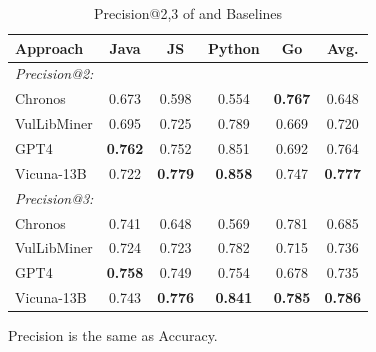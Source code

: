 \begin{table}[t]
\centering
\caption{Precision@2,3 of \detector{} and Baselines}
\label{tab: baseline cmp: precision}
\small
\begin{threeparttable}
\begin{tabular}{lccccc}
\toprule
Approach     & Java    & JS     & Python & Go  & Avg.   \\
\midrule
\multicolumn{5}{l}{\textit{Precision@2:}} &              \\
Chronos     & 0.673    & 0.598 & 0.554  & \textbf{0.767} & 0.648   \\
VulLibMiner & 0.695    & 0.725 & 0.789  & 0.669 & 0.720   \\
GPT4        & \textbf{0.762}    & 0.752 & 0.851  & 0.692 & 0.764   \\
Vicuna-13B  & 0.722    & \textbf{0.779} & \textbf{0.858}  & 0.747 & \textbf{0.777}   \\
\midrule
\multicolumn{5}{l}{\textit{Precision@3:}} &   \\
Chronos     & 0.741    & 0.648 & 0.569  & 0.781 & 0.685   \\
VulLibMiner & 0.724    & 0.723 & 0.782  & 0.715 & 0.736   \\
GPT4        & \textbf{0.758}    & 0.749 & 0.754  & 0.678 & 0.735   \\
Vicuna-13B  & 0.743    & \textbf{0.776} &\textbf{ 0.841}  & \textbf{0.785} & \textbf{0.786}   \\
\bottomrule
\end{tabular}
\begin{tablenotes}
    \footnotesize
    \item Precision is the same as Accuracy.
\end{tablenotes}
\end{threeparttable}
\vspace{-0.4cm}
\end{table}

